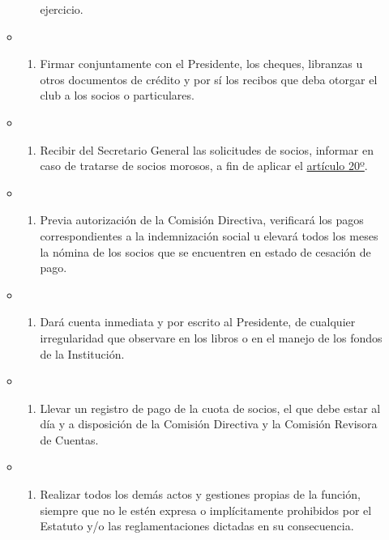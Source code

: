 \documentclass[]{book}
\providecommand{\tightlist}{%
  \setlength{\itemsep}{0pt}\setlength{\parskip}{0pt}}
\begin{document}
\begin{itemize}
\begin{itemize}
\begin{enumerate}
      ejercicio.
    \end{enumerate}
  \item
    \begin{enumerate}
    \def\labelenumi{\alph{enumi})}
    \setcounter{enumi}{5}
    \tightlist
    \item
      Firmar conjuntamente con el Presidente, los cheques, libranzas u
      otros documentos de crédito y por sí los recibos que deba otorgar
      el club a los socios o particulares.
    \end{enumerate}
  \item
    \begin{enumerate}
    \def\labelenumi{\alph{enumi})}
    \setcounter{enumi}{6}
    \tightlist
    \item
      Recibir del Secretario General las solicitudes de socios, informar
      en caso de tratarse de socios morosos, a fin de aplicar el
      \protect\hyperlink{art20}{artículo 20º}.
    \end{enumerate}
  \item
    \begin{enumerate}
    \def\labelenumi{\alph{enumi})}
    \setcounter{enumi}{7}
    \tightlist
    \item
      Previa autorización de la Comisión Directiva, verificará los pagos
      correspondientes a la indemnización social u elevará todos los
      meses la nómina de los socios que se encuentren en estado de
      cesación de pago.
    \end{enumerate}
  \item
    \begin{enumerate}
    \def\labelenumi{\roman{enumi})}
    \tightlist
    \item
      Dará cuenta inmediata y por escrito al Presidente, de cualquier
      irregularidad que observare en los libros o en el manejo de los
      fondos de la Institución.
    \end{enumerate}
  \item
    \begin{enumerate}
    \def\labelenumi{\alph{enumi})}
    \setcounter{enumi}{9}
    \tightlist
    \item
      Llevar un registro de pago de la cuota de socios, el que debe
      estar al día y a disposición de la Comisión Directiva y la
      Comisión Revisora de Cuentas.
    \end{enumerate}
  \item
    \begin{enumerate}
    \def\labelenumi{\alph{enumi})}
    \setcounter{enumi}{10}
    \tightlist
    \item
      Realizar todos los demás actos y gestiones propias de la función,
      siempre que no le estén expresa o implícitamente prohibidos por el
      Estatuto y/o las reglamentaciones dictadas en su consecuencia.
    \end{enumerate}
  \end{itemize}
\end{itemize}
\end{document}
